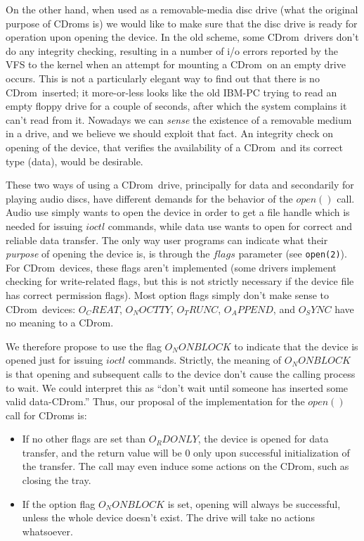\documentclass{article}
\def\cdrom{{\sc CDrom}}
\begin{document}
On the other hand, when used as a removable-media disc drive (what the
original purpose of \cdrom s is) we would like to make sure that the
disc drive is ready for operation upon opening the device. In the old
scheme, some \cdrom\ drivers don't do any integrity checking, resulting
in a number of i/o errors reported by the VFS to the kernel when an
attempt for mounting a \cdrom\ on an empty drive occurs. This is not a
particularly elegant way to find out that there is no \cdrom\ inserted;
it more-or-less looks like the old IBM-PC trying to read an empty floppy
drive for a couple of seconds, after which the system complains it
can't read from it. Nowadays we can {\em sense\/} the existence of a
removable medium in a drive, and we believe we should exploit that
fact. An integrity check on opening of the device, that verifies the
availability of a \cdrom\ and its correct type (data), would be
desirable.

These two ways of using a \cdrom\ drive, principally for data and
secondarily for playing audio discs, have different demands for the
behavior of the $open()$ call. Audio use simply wants to open the
device in order to get a file handle which is needed for issuing
$ioctl$ commands, while data use wants to open for correct and
reliable data transfer. The only way user programs can indicate what
their {\em purpose\/} of opening the device is, is through the $flags$
parameter (see {\tt open(2)}). For \cdrom\ devices, these flags aren't
implemented (some drivers implement checking for write-related flags,
but this is not strictly necessary if the device file has correct
permission flags). Most option flags simply don't make sense to
\cdrom\ devices: $O_CREAT$, $O_NOCTTY$, $O_TRUNC$, $O_APPEND$, and
$O_SYNC$ have no meaning to a \cdrom. 

We therefore propose to use the flag $O_NONBLOCK$ to indicate
that the device is opened just for issuing $ioctl$
commands. Strictly, the meaning of $O_NONBLOCK$ is that opening and
subsequent calls to the device don't cause the calling process to
wait. We could interpret this as ``don't wait until someone has
inserted some valid data-\cdrom.'' Thus, our proposal of the
implementation for the $open()$ call for \cdrom s is:
\begin{itemize}
\item If no other flags are set than $O_RDONLY$, the device is opened
for data transfer, and the return value will be 0 only upon successful
initialization of the transfer. The call may even induce some actions
on the \cdrom, such as closing the tray.  
\item If the option flag $O_NONBLOCK$ is set, opening will always be
successful, unless the whole device doesn't exist. The drive will take
no actions whatsoever. 
\end{itemize}
\end{document}

